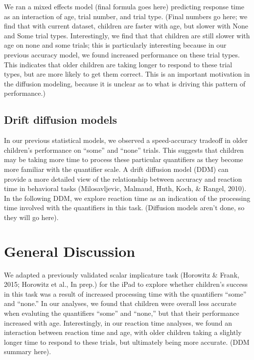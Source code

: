 \documentclass[10pt, letterpaper]{article}
\begin{document}
We ran a mixed effects model (final formula goes here) predicting
response time as an interaction of age, trial number, and trial type.
(Final numbers go here; we find that with current dataset, children are
faster with age, but slower with None and Some trial types.
Interestingly, we find that that children are still slower with age on
none and some trials; this is particularly interesting because in our
previous accuracy model, we found increased performance on these trial
types. This indicates that older children are taking longer to respond
to these trial types, but are more likely to get them correct. This is
an important motivation in the diffusion modeling, because it is unclear
as to what is driving this pattern of performance.)

\subsection{Drift diffusion models}\label{drift-diffusion-models}

In our previous statistical models, we observed a speed-accuracy
tradeoff in older children's performance on ``some'' and ``none''
trials. This suggests that children may be taking more time to process
these particular quantifiers as they become more familiar with the
quantifier scale. A drift diffusion model (DDM) can provide a more
detailed view of the relationship between accuracy and reaction time in
behavioral tasks (Milosavljevic, Malmaud, Huth, Koch, \& Rangel, 2010).
In the following DDM, we explore reaction time as an indication of the
processing time involved with the quantifiers in this task. (Diffusion
models aren't done, so they will go here).

\section{General Discussion}\label{general-discussion}

We adapted a previously validated scalar implicature task (Horowitz \&
Frank, 2015; Horowitz et al., In prep.) for the iPad to explore whether
children's success in this task was a result of increased processing
time with the quantifiers ``some'' and ``none.'' In our analyses, we
found that children were overall less accurate when evaluting the
quantifiers ``some'' and ``none,'' but that their performance increased
with age. Interestingly, in our reaction time analyses, we found an
interaction between reaction time and age, with older children taking a
slightly longer time to respond to these trials, but ultimately being
more accurate. (DDM summary here).
\end{document}
